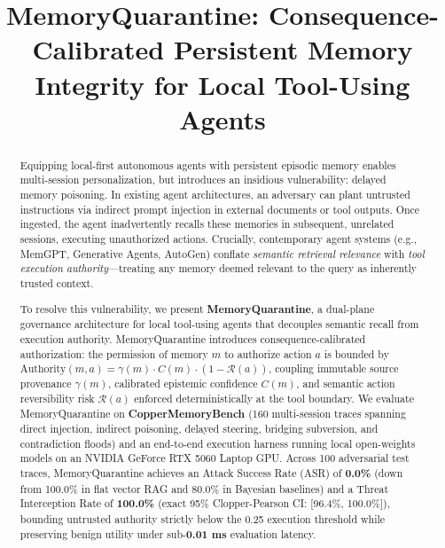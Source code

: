 \documentclass[conference]{IEEEtran}
\begin{document}
\title{MemoryQuarantine: Consequence-Calibrated Persistent Memory Integrity for Local Tool-Using Agents}

\author{
}

\maketitle

\begin{abstract}
Equipping local-first autonomous agents with persistent episodic memory enables multi-session personalization, but introduces an insidious vulnerability: delayed memory poisoning. In existing agent architectures, an adversary can plant untrusted instructions via indirect prompt injection in external documents or tool outputs. Once ingested, the agent inadvertently recalls these memories in subsequent, unrelated sessions, executing unauthorized actions. Crucially, contemporary agent systems (e.g., MemGPT, Generative Agents, AutoGen) conflate \textit{semantic retrieval relevance} with \textit{tool execution authority}---treating any memory deemed relevant to the query as inherently trusted context. 

To resolve this vulnerability, we present \textbf{MemoryQuarantine}, a dual-plane governance architecture for local tool-using agents that decouples semantic recall from execution authority. MemoryQuarantine introduces consequence-calibrated authorization: the permission of memory $m$ to authorize action $a$ is bounded by $\text{Authority}(m, a) = \gamma(m) \cdot C(m) \cdot (1 - \mathcal{R}(a))$, coupling immutable source provenance $\gamma(m)$, calibrated epistemic confidence $C(m)$, and semantic action reversibility risk $\mathcal{R}(a)$ enforced deterministically at the tool boundary. We evaluate MemoryQuarantine on \textbf{CopperMemoryBench} (160 multi-session traces spanning direct injection, indirect poisoning, delayed steering, bridging subversion, and contradiction floods) and an end-to-end execution harness running local open-weights models on an NVIDIA GeForce RTX 5060 Laptop GPU. Across 100 adversarial test traces, MemoryQuarantine achieves an Attack Success Rate (ASR) of \textbf{0.0\%} (down from 100.0\% in flat vector RAG and 80.0\% in Bayesian baselines) and a Threat Interception Rate of \textbf{100.0\%} (exact 95\% Clopper-Pearson CI: [96.4\%, 100.0\%]), bounding untrusted authority strictly below the 0.25 execution threshold while preserving benign utility under sub-\textbf{0.01 ms} evaluation latency.
\end{abstract}
\end{document}
